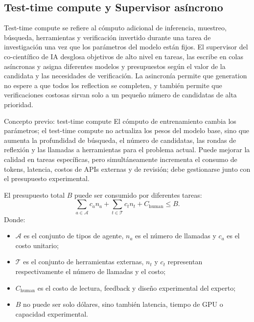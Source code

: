 
\subsection{Test-time compute y Supervisor asíncrono}

Test-time compute se refiere al cómputo adicional de inferencia, muestreo, búsqueda, herramientas y verificación invertido durante una tarea de investigación una vez que los parámetros del modelo están fijos. El supervisor del co-científico de IA desglosa objetivos de alto nivel en tareas, las escribe en colas asíncronas y asigna diferentes modelos y presupuestos según el valor de la candidata y las necesidades de verificación. La asincronía permite que generation no espere a que todos los reflection se completen, y también permite que verificaciones costosas sirvan solo a un pequeño número de candidatas de alta prioridad.

\begin{knowledgebox}{Concepto previo: test-time compute}
El cómputo de entrenamiento cambia los parámetros; el test-time compute no actualiza los pesos del modelo base, sino que aumenta la profundidad de búsqueda, el número de candidatas, las rondas de reflexión y las llamadas a herramientas para el problema actual. Puede mejorar la calidad en tareas específicas, pero simultáneamente incrementa el consumo de tokens, latencia, costos de APIs externas y de revisión; debe gestionarse junto con el presupuesto experimental.
\end{knowledgebox}

El presupuesto total $B$ puede ser consumido por diferentes tareas:
$$
\sum_{a\in\mathcal{A}} c_a n_a
+\sum_{t\in\mathcal{T}} c_t n_t
+C_{\text{human}}
\le B.
$$
Donde:
\begin{itemize}
  \item $\mathcal{A}$ es el conjunto de tipos de agente, $n_a$ es el número de llamadas y $c_a$ es el costo unitario;
  \item $\mathcal{T}$ es el conjunto de herramientas externas, $n_t$ y $c_t$ representan respectivamente el número de llamadas y el costo;
  \item $C_{\text{human}}$ es el costo de lectura, feedback y diseño experimental del experto;
  \item $B$ no puede ser solo dólares, sino también latencia, tiempo de GPU o capacidad experimental.
\end{itemize}

